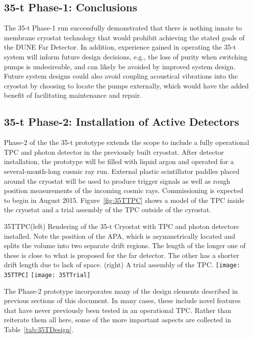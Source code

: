 \subsection{35-t Phase-1: Conclusions}
The 35-t Phase-1 run successfully demonstrated that there is nothing innate to
membrane cryostat technology that would prohibit achieving the stated goals of the
DUNE Far Detector. In addition, experience gained in operating the 35-t system
will inform future design decisions, e.g., the loss of purity when switching pumps is
undesireable, and can likely be avoided by improved system design. Future system
designs could also avoid coupling acoustical vibrations into the cryostat by choosing
to locate the pumps externally, which would have the added benefit of facilitating
maintenance and repair.

\subsection{35-t Phase-2: Installation of Active Detectors}
Phase-2 of the the 35-t prototype extends the scope to include a
fully operational TPC and photon detector in the previously built
cryostat.  After detector installation, the prototype will be filled
with liquid argon and operated for a several-month-long cosmic ray
run.  External plastic scintillator paddles placed around the cryostat
will be used to produce trigger signals as well as rough position
measurements of the incoming cosmic rays.  Commissioning is expected
to begin in August 2015.  Figure~\ref{fig:35TTPC} shows a model of the
TPC inside the cryostat and a trial assembly of the TPC outside of the
cyrostat.

\begin{cdrfigure}{35TTPC}{(left) Rendering of the
35-t Cryostat with TPC and photon detectors installed. 
Note the position of the APA, which is asymmetrically located and 
splits the volume into two separate drift regions.
The length of the longer one of these is close to what is proposed for the far detector. 
The other has a shorter drift length due to lack of space.
(right) A trial assembly of the TPC.
}
\texttt{[image: 35TTPC]}  
\texttt{[image: 35TTrial]}  
\end{cdrfigure}

The Phase-2 prototype incorporates many of the design elements described in previous
sections of this document.
In many cases, these include novel features that have never previously been tested
in an operational TPC.
Rather than reiterate them all here, some of the more important
aspects are collected in Table~\ref{tab:35TDesign}.

